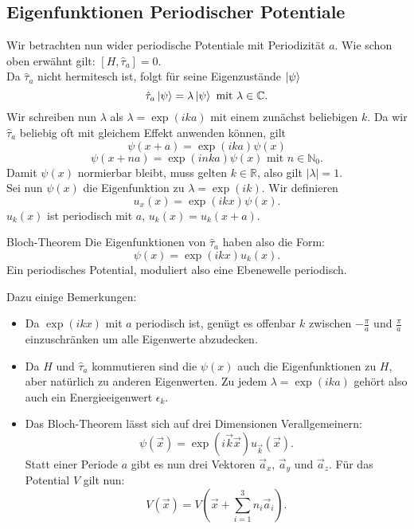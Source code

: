 \documentclass{report}
\begin{document}
\subsection{Eigenfunktionen Periodischer Potentiale}
Wir betrachten nun wider periodische Potentiale mit Periodizität $a$. Wie schon oben erwähnt gilt: $[H, \hat{\tau}_a] = 0$. \\
Da $\hat{\tau}_a$ nicht hermitesch ist, folgt für seine Eigenzustände $\ket{\psi}$ \[
	\hat{\tau}_a \ket{\psi } = \lambda \ket{\psi }  \text{ mit } \lambda \in \mathbb{C}
.\] Wir schreiben nun $\lambda$ als $\lambda = \exp(ika)$ mit einem zunächst beliebigen $k$. Da wir $\hat{\tau}_a$ beliebig oft mit gleichem Effekt anwenden können, gilt \[
\psi(x+a) = \exp(ika) \psi(x)
\] \[
\psi(x+na) = \exp(inka)\psi(x) \text{ mit } n \in \mathbb{N}_0 
.\]   Damit $\psi(x)$ normierbar bleibt, muss gelten $k \in \mathbb{R}$, also gilt $|\lambda| = 1$.\\
Sei nun  $\psi(x)$ die Eigenfunktion zu $\lambda = \exp(ik)$. Wir definieren \[
	u_x(x) = \exp(ikx) \psi(x)
.\] $u_k(x)$ ist periodisch mit $a$, $u_k(x) = u_k(x+a)$.\\
\begin{redbox}{Bloch-Theorem}
Die Eigenfunktionen von $\hat{\tau}_a$ haben also die Form: \[
	\psi(x) = \exp(ikx) u_k(x)
.\] Ein periodisches Potential, moduliert also eine Ebenewelle periodisch. 
\end{redbox} 
Dazu einige Bemerkungen:
\begin{itemize}
	\item Da $\exp(ikx)$ mit $a$ periodisch ist, genügt es offenbar $k$ zwischen $-\frac{\pi}{a}$ und $\frac{\pi}{a}$ einzuschränken um alle Eigenwerte abzudecken.
	\item Da $H$ und $\hat{\tau}_a$ kommutieren sind die $\psi(x)$ auch die Eigenfunktionen zu $H$, aber natürlich zu anderen Eigenwerten. Zu jedem $\lambda = \exp(ika)$ gehört also auch ein Energieeigenwert $\epsilon_k$.
	\item Das Bloch-Theorem lässt sich auf drei Dimensionen Verallgemeinern: \[
			\psi(\vec{x}) = \exp(i \vec{k}\vec{x}) u_{\vec{k}}(\vec{x}) 
		.\] Statt einer Periode $a$ gibt es nun drei Vektoren $\vec{a}_x$,  $\vec{a}_y$ und $\vec{a}_z$. Für das Potential $V$ gilt nun: \[
		V(\vec{x}) = V(\vec{x} + \sum_{i=1}^{3} n_i \vec{a}_i)
		.\] 
\end{itemize}
\end{document}
